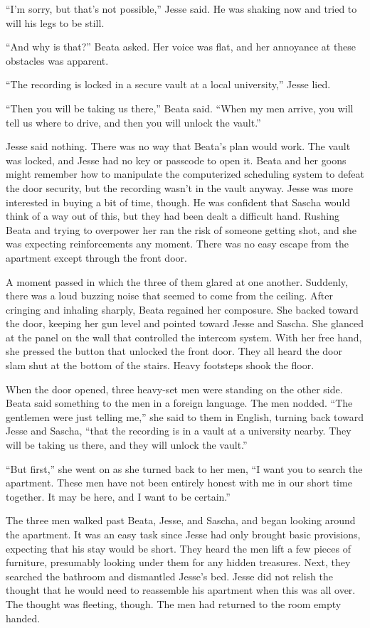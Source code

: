\documentclass[12pt]{book}
\begin{document}
``I'm sorry, but that's not possible,'' Jesse said.  He was shaking now and tried to will his legs to be still.

``And why is that?'' Beata asked.  Her voice was flat, and her annoyance at these obstacles was apparent.

``The recording is locked in a secure vault at a local university,'' Jesse lied.

``Then you will be taking us there,'' Beata said.  ``When my men arrive, you will tell us where to drive, and then you will unlock the vault.''

Jesse said nothing.  There was no way that Beata's plan would work.  The vault was locked, and Jesse had no key or passcode to open it.  Beata and her goons might remember how to manipulate the computerized scheduling system to defeat the door security, but the recording wasn't in the vault anyway.  Jesse was more interested in buying a bit of time, though.  He was confident that Sascha would think of a way out of this, but they had been dealt a difficult hand.  Rushing Beata and trying to overpower her ran the risk of someone getting shot, and she was expecting reinforcements any moment.  There was no easy escape from the apartment except through the front door.

A moment passed in which the three of them glared at one another.  Suddenly, there was a loud buzzing noise that seemed to come from the ceiling.  After cringing and inhaling sharply, Beata regained her composure.  She backed toward the door, keeping her gun level and pointed toward Jesse and Sascha.  She glanced at the panel on the wall that controlled the intercom system.  With her free hand, she pressed the button that unlocked the front door.  They all heard the door slam shut at the bottom of the stairs.  Heavy footsteps shook the floor.

When the door opened, three heavy-set men were standing on the other side.  Beata said something to the men in a foreign language.  The men nodded.  ``The gentlemen were just telling me,'' she said to them in English, turning back toward Jesse and Sascha, ``that the recording is in a vault at a university nearby.  They will be taking us there, and they will unlock the vault.''

``But first,'' she went on as she turned back to her men, ``I want you to search the apartment.  These men have not been entirely honest with me in our short time together.  It may be here, and I want to be certain.''

The three men walked past Beata, Jesse, and Sascha, and began looking around the apartment.  It was an easy task since Jesse had only brought basic provisions, expecting that his stay would be short.  They heard the men lift a few pieces of furniture, presumably looking under them for any hidden treasures.  Next, they searched the bathroom and dismantled Jesse's bed.  Jesse did not relish the thought that he would need to reassemble his apartment when this was all over.  The thought was fleeting, though.  The men had returned to the room empty handed.
\end{document}
